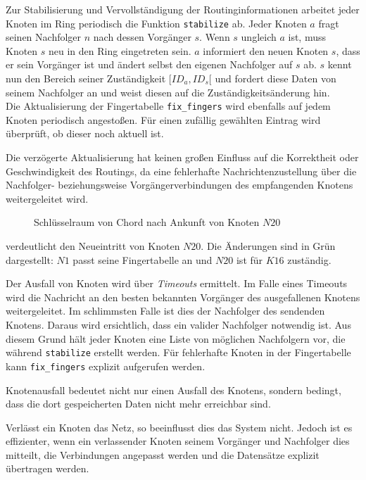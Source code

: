 Zur Stabilisierung und Vervollständigung der Routinginformationen arbeitet jeder Knoten im Ring periodisch die Funktion \texttt{stabilize} ab. Jeder Knoten $a$ fragt seinen Nachfolger $n$ nach dessen Vorgänger $s$. Wenn $s$ ungleich $a$ ist, muss Knoten $s$ neu in den Ring eingetreten sein. $a$ informiert den neuen Knoten $s$, dass er sein Vorgänger ist und ändert selbst den eigenen Nachfolger auf $s$ ab. $s$ kennt nun den Bereich seiner Zuständigkeit $[ID_a, ID_s[$ und fordert diese Daten von seinem Nachfolger an und weist diesen auf die Zuständigkeitsänderung hin.\\
Die Aktualisierung der Fingertabelle \texttt{fix\_fingers} wird ebenfalls auf jedem Knoten periodisch angestoßen. Für einen zufällig gewählten Eintrag wird überprüft, ob dieser noch aktuell ist.

Die verzögerte Aktualisierung hat keinen großen Einfluss auf die Korrektheit oder Geschwindigkeit des Routings, da eine fehlerhafte Nachrichtenzustellung über die Nachfolger- beziehungsweise Vorgängerverbindungen des empfangenden Knotens weitergeleitet wird.

\begin{figure}[htbp]
\centering
{}
\caption{Schlüsselraum von Chord nach Ankunft von Knoten $N20$}
\label{fig:chord_new_node}
\end{figure}

 verdeutlicht den Neueintritt von Knoten $N20$. Die Änderungen sind in Grün dargestellt: $N1$ passt seine Fingertabelle an und $N20$ ist für $K16$ zuständig.

Der Ausfall von Knoten wird über \emph{Timeouts} ermittelt. Im Falle eines Timeouts wird die Nachricht an den besten bekannten Vorgänger des ausgefallenen Knotens weitergeleitet. Im schlimmsten Falle ist dies der Nachfolger des sendenden Knotens. Daraus wird ersichtlich, dass ein valider Nachfolger notwendig ist. Aus diesem Grund hält jeder Knoten eine Liste von möglichen Nachfolgern vor, die während \texttt{stabilize} erstellt werden. Für fehlerhafte Knoten in der Fingertabelle kann \texttt{fix\_fingers} explizit aufgerufen werden.

Knotenausfall bedeutet nicht nur einen Ausfall des Knotens, sondern bedingt, dass die dort gespeicherten Daten nicht mehr erreichbar sind.

Verlässt ein Knoten das Netz, so beeinflusst dies das System nicht. Jedoch ist es effizienter, wenn ein verlassender Knoten seinem Vorgänger und Nachfolger dies mitteilt, die Verbindungen angepasst werden und die Datensätze explizit übertragen werden.
